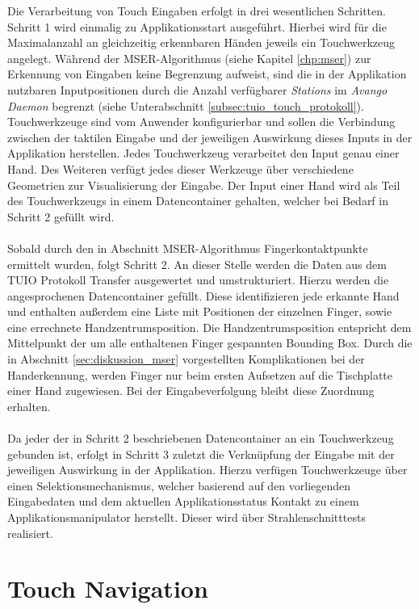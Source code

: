 Die Verarbeitung von Touch Eingaben erfolgt in drei wesentlichen Schritten. Schritt 1 wird einmalig zu Applikationsstart ausgeführt. Hierbei wird für die Maximalanzahl an gleichzeitig erkennbaren Händen jeweils ein Touchwerkzeug angelegt. Während der MSER-Algorithmus (siehe Kapitel \ref{chp:mser}) zur Erkennung von Eingaben keine Begrenzung aufweist, sind die in der Applikation nutzbaren Inputpositionen durch die Anzahl verfügbarer \emph{Stations} im \emph{Avango Daemon} begrenzt (siehe Unterabschnitt \ref{subsec:tuio_touch_protokoll}). Touchwerkzeuge sind vom Anwender konfigurierbar und sollen die Verbindung zwischen der taktilen Eingabe und der jeweiligen Auswirkung dieses Inputs in der Applikation herstellen. Jedes Touchwerkzeug verarbeitet den Input genau einer Hand. Des Weiteren verfügt jedes dieser Werkzeuge über verschiedene Geometrien zur Visualisierung der Eingabe. Der Input einer Hand wird als Teil des Touchwerkzeugs in einem Datencontainer gehalten, welcher bei Bedarf in Schritt 2 gefüllt wird.
\\\\
Sobald durch den in Abschnitt MSER-Algorithmus Fingerkontaktpunkte ermittelt wurden, folgt Schritt 2. An dieser Stelle werden die Daten aus dem TUIO Protokoll Transfer ausgewertet und umstrukturiert. Hierzu werden die angesprochenen Datencontainer gefüllt. Diese identifizieren jede erkannte Hand und enthalten außerdem eine Liste mit Positionen der einzelnen Finger, sowie eine errechnete Handzentrumsposition. Die Handzentrumsposition entspricht dem Mittelpunkt der um alle enthaltenen Finger gespannten Bounding Box. Durch die in Abschnitt \ref{sec:diskussion_mser} vorgestellten Komplikationen bei der Handerkennung, werden Finger nur beim ersten Aufsetzen auf die Tischplatte einer Hand zugewiesen. Bei der Eingabeverfolgung bleibt diese Zuordnung erhalten.
\\\\
Da jeder der in Schritt 2 beschriebenen Datencontainer an ein Touchwerkzeug gebunden ist, erfolgt in Schritt 3 zuletzt die Verknüpfung der Eingabe mit der jeweiligen Auswirkung in der Applikation. Hierzu verfügen Touchwerkzeuge über einen Selektionsmechanismus, welcher basierend auf den vorliegenden Eingabedaten und dem aktuellen Applikationsstatus Kontakt zu einem Applikationsmanipulator herstellt. Dieser wird über Strahlenschnitttests realisiert.


\section{Touch Navigation}
\label{sec:touch_navigation}

